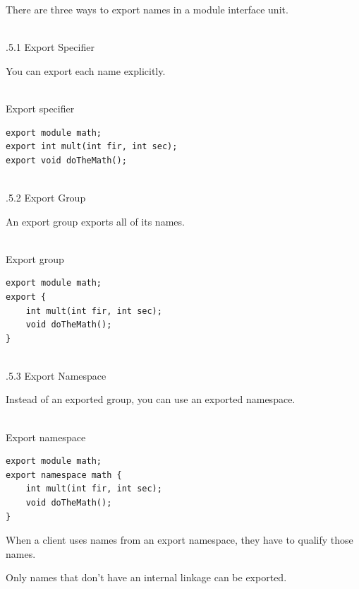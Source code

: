 
There are three ways to export names in a module interface unit.

\hspace*{\fill} \\ %
.5.1\hspace{0.2cm} Export Specifier

You can export each name explicitly.

\hspace*{\fill} \\ %
\noindent
Export specifier
\begin{lstlisting}[style=styleCXX]
export module math;
export int mult(int fir, int sec);
export void doTheMath();
\end{lstlisting}

\hspace*{\fill} \\ %
.5.2\hspace{0.2cm} Export Group

An export group exports all of its names.

\hspace*{\fill} \\ %
\noindent
Export group
\begin{lstlisting}[style=styleCXX]
export module math;
export {
	int mult(int fir, int sec);
	void doTheMath();
}
\end{lstlisting}

\hspace*{\fill} \\ %
.5.3\hspace{0.2cm} Export Namespace

Instead of an exported group, you can use an exported namespace.

\hspace*{\fill} \\ %
\noindent
Export namespace
\begin{lstlisting}[style=styleCXX]
export module math;
export namespace math {
	int mult(int fir, int sec);
	void doTheMath();
}
\end{lstlisting}

When a client uses names from an export namespace, they have to qualify those names.

Only names that don’t have an internal linkage can be exported.

